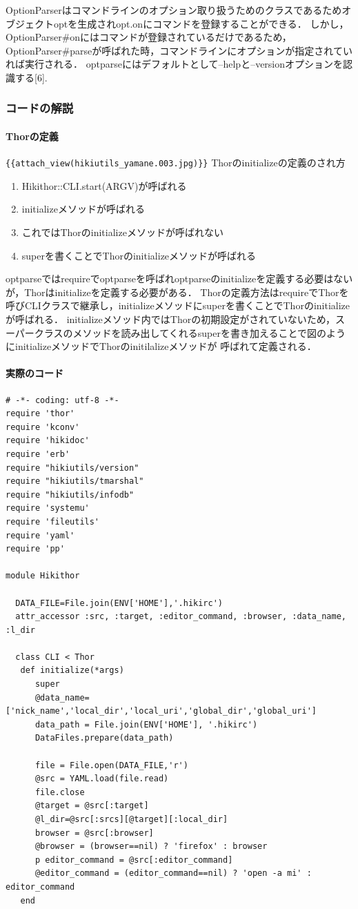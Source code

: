 OptionParserはコマンドラインのオプション取り扱うためのクラスであるためオブジェクトoptを生成されopt.onにコマンドを登録することができる．
しかし，OptionParser\#onにはコマンドが登録されているだけであるため，OptionParser\#parseが呼ばれた時，コマンドラインにオプションが指定されていれば実行される．
optparseにはデフォルトとして--helpと--versionオプションを認識する[6].

\subsubsection{コードの解説}
\paragraph{Thorの定義}
\verb|{{attach_view(hikiutils_yamane.003.jpg)}}|
Thorのinitializeの定義のされ方

\begin{enumerate}
\item Hikithor::CLI.start(ARGV)が呼ばれる
\item initializeメソッドが呼ばれる
\item これではThorのinitializeメソッドが呼ばれない
\item superを書くことでThorのinitializeメソッドが呼ばれる
\end{enumerate}
optparseではrequireでoptparseを呼ばれoptparseのinitializeを定義する必要はないが，Thorはinitializeを定義する必要がある．
Thorの定義方法はrequireでThorを呼びCLIクラスで継承し，initializeメソッドにsuperを書くことでThorのinitializeが呼ばれる．
initializeメソッド内ではThorの初期設定がされていないため，スーパークラスのメソッドを読み出してくれるsuperを書き加えることで図のようにinitializeメソッドでThorのinitilalizeメソッドが
呼ばれて定義される．

\paragraph{実際のコード}\begin{lstlisting}[style=customRuby]
# -*- coding: utf-8 -*-                                                         
require 'thor'
require 'kconv'
require 'hikidoc'
require 'erb'
require "hikiutils/version"
require "hikiutils/tmarshal"
require "hikiutils/infodb"
require 'systemu'
require 'fileutils'
require 'yaml'
require 'pp'

module Hikithor

  DATA_FILE=File.join(ENV['HOME'],'.hikirc')
  attr_accessor :src, :target, :editor_command, :browser, :data_name, :l_dir

  class CLI < Thor
   def initialize(*args)
      super
      @data_name=['nick_name','local_dir','local_uri','global_dir','global_uri']
      data_path = File.join(ENV['HOME'], '.hikirc')
      DataFiles.prepare(data_path)

      file = File.open(DATA_FILE,'r')
      @src = YAML.load(file.read)
      file.close
      @target = @src[:target]
      @l_dir=@src[:srcs][@target][:local_dir]
      browser = @src[:browser]
      @browser = (browser==nil) ? 'firefox' : browser
      p editor_command = @src[:editor_command]
      @editor_command = (editor_command==nil) ? 'open -a mi' : editor_command
   end
\end{lstlisting}
